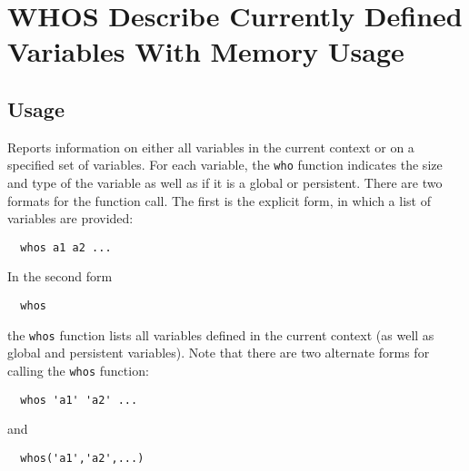 \section{WHOS Describe Currently Defined Variables With Memory Usage}

\subsection{Usage}

Reports information on either all variables in the current context
or on a specified set of variables.  For each variable, the \verb|who|
function indicates the size and type of the variable as well as 
if it is a global or persistent.  There are two formats for the 
function call.  The first is the explicit form, in which a list
of variables are provided:
\begin{verbatim}
  whos a1 a2 ...
\end{verbatim}
In the second form
\begin{verbatim}
  whos
\end{verbatim}
the \verb|whos| function lists all variables defined in the current 
context (as well as global and persistent variables). Note that
there are two alternate forms for calling the \verb|whos| function:
\begin{verbatim}
  whos 'a1' 'a2' ...
\end{verbatim}
and
\begin{verbatim}
  whos('a1','a2',...)
\end{verbatim}
